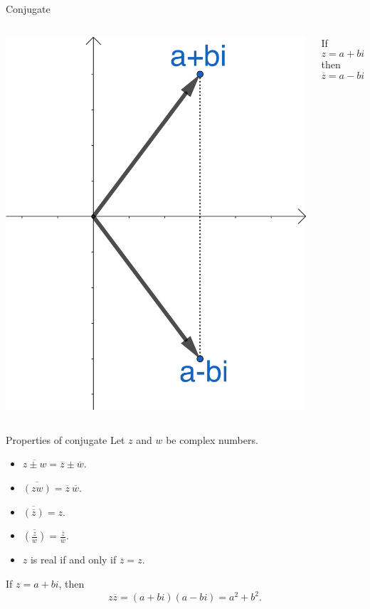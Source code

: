\documentclass{beamer}
\begin{document}
\begin{frame}{Conjugate}
\begin{columns}
	\includegraphics[scale=0.6]{conjugate.png}
	\begin{definition}[Conjugate]
	If
	\begin{equation*}
	z=a+bi
	\end{equation*}
	then
	\begin{equation*}
	\overline{z} = a-bi
	\end{equation*}
	\end{definition}
\end{columns}
\end{frame}

\begin{frame}{Properties of conjugate}
Let $z$ and $w$ be complex numbers.
\begin{itemize}
\item
$\overline{z\pm w} = \overline{z} \pm \overline{w}$.
\item
$\overline{(zw)} = \overline{z}~ \overline{w}$.
\item
$\overline{(\overline{z})}=z$.
\item
$\overline{\left(\frac{z}{w}\right)} =
\frac{\overline{z}}{\overline{w}}$.
\item
$z$ is real if and only if $\overline{z}=z$.
\end{itemize}
If $z=a+bi$, then
\[ z\overline{z}=
(a+bi)(a-bi)=
a^2 + b^2.\]
\end{frame}
\end{document}
